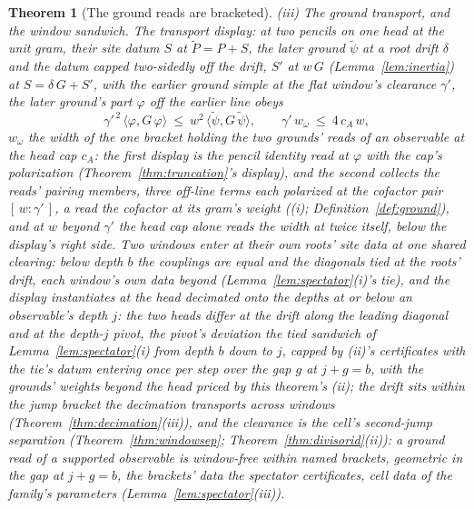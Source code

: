 \documentclass[11pt]{article}
\newtheorem{theorem}{Theorem}
\theoremstyle{definition}
\begin{document}
\begin{theorem}[The ground reads are bracketed]
\emph{(iii) The ground transport, and the window sandwich.} The
\emph{transport display}: at two pencils on one head at the unit
gram, their site datum $S$ at $\tilde P=P+S$, the later ground
$\tilde\psi$ at a root drift $\delta$ and
the datum capped two-sidedly off the drift,
$S'$ at $w\,G$ (Lemma~\ref{lem:inertia}) at $S=\delta\,G+S'$, with the earlier
ground simple at the flat window's clearance $\gamma'$, the later
ground's part $\varphi$ off the earlier line obeys
\[
\gamma'^{\,2}\,\langle\varphi,G\,\varphi\rangle\ \le\
w^{2}\,\langle\tilde\psi,G\,\tilde\psi\rangle ,
\qquad
\gamma'\,w_\omega\ \le\ 4\,c_A\,w ,
\]
$w_\omega$ the width of the one bracket holding the two grounds'
reads of an observable at the head cap $c_A$: the first display is
the pencil identity read at $\varphi$ with the cap's polarization
(Theorem~\ref{thm:truncation}'s display), and the second collects
the reads' pairing members, three off-line terms each polarized at the
cofactor pair $[\,w:\gamma'\,]$, a read the cofactor at its gram's
weight ((i); Definition~\ref{def:ground}), and at $w$ beyond
$\gamma'$ the head cap alone reads the width at twice itself, below
the display's right side. Two windows enter at their
own roots' site data at one shared clearing: below depth $b$ the
couplings are equal and the diagonals tied at the roots' drift, each
window's own data beyond (Lemma~\ref{lem:spectator}(i)'s tie), and
the display instantiates at the head decimated onto the depths at or
below an observable's depth $j$: the two heads differ at the drift
along the leading diagonal and at the depth-$j$ pivot, the pivot's
deviation the tied sandwich of Lemma~\ref{lem:spectator}(i) from
depth $b$ down to $j$, capped by (ii)'s certificates with the tie's
datum entering once per step over the gap $g$ at $j+g=b$, with the
grounds' weights beyond the head priced by this theorem's (ii); the
drift sits within the jump bracket the decimation transports across windows
(Theorem~\ref{thm:decimation}(iii)), and the clearance is the cell's
second-jump separation (Theorem~\ref{thm:windowsep};
Theorem~\ref{thm:divisorid}(ii)): a ground read of a supported
observable is window-free within named brackets, geometric in the
gap at $j+g=b$, the brackets' data the spectator certificates,
cell data of the family's parameters
(Lemma~\ref{lem:spectator}(iii)).


\end{theorem}
\end{document}
